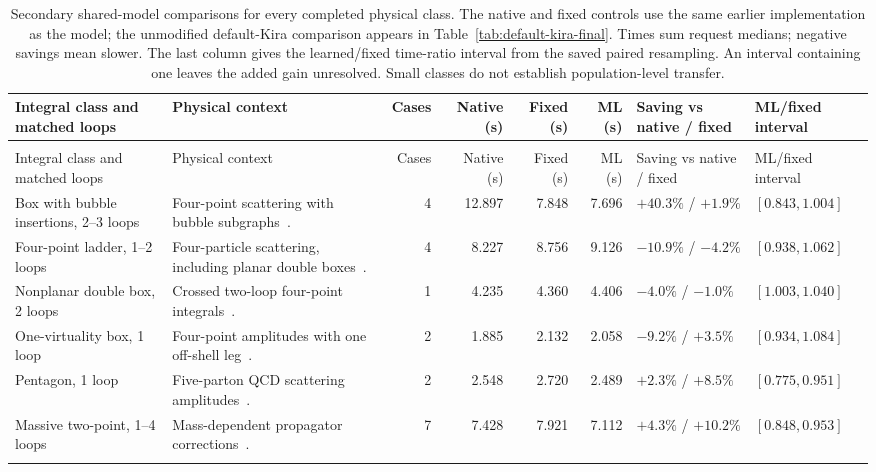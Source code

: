 \begin{landscape}
\small\setlength{\tabcolsep}{5pt}
\begin{longtable}{@{}>{\raggedright\arraybackslash}p{3.8cm}>{\raggedright\arraybackslash}p{4.4cm}rrrr>{\raggedright\arraybackslash}p{3.1cm}>{\raggedright\arraybackslash}p{3.1cm}@{}}
\caption{Secondary shared-model comparisons for every completed physical class. The native and fixed controls use the same earlier implementation as the model; the unmodified default-Kira comparison appears in Table~\ref{tab:default-kira-final}. Times sum request medians; negative savings mean slower. The last column gives the learned/fixed time-ratio interval from the saved paired resampling. An interval containing one leaves the added gain unresolved. Small classes do not establish population-level transfer.}\label{tab:native-type-summary}\\
\toprule
Integral class and matched loops & Physical context & Cases & Native (s) & Fixed (s) & ML (s) & Saving vs native / fixed & ML/fixed interval\\\midrule
\endfirsthead
\multicolumn{8}{l}{\tablename~\thetable\ continued}\\
\toprule Integral class and matched loops & Physical context & Cases & Native (s) & Fixed (s) & ML (s) & Saving vs native / fixed & ML/fixed interval\\\midrule
\endhead
\bottomrule\endfoot
Box with bubble insertions, 2--3 loops & Four-point scattering with bubble subgraphs~\cite{Weinzierl2022}. & 4 & 12.897 & 7.848 & 7.696 & $+40.3\%$ / $+1.9\%$ & $[0.843,1.004]$ \\ \addlinespace[3pt]
Four-point ladder, 1--2 loops & Four-particle scattering, including planar double boxes~\cite{Smirnov1999}. & 4 & 8.227 & 8.756 & 9.126 & $-10.9\%$ / $-4.2\%$ & $[0.938,1.062]$ \\ \addlinespace[3pt]
Nonplanar double box, 2 loops & Crossed two-loop four-point integrals~\cite{Tausk1999}. & 1 & 4.235 & 4.360 & 4.406 & $-4.0\%$ / $-1.0\%$ & $[1.003,1.040]$ \\ \addlinespace[3pt]
One-virtuality box, 1 loop & Four-point amplitudes with one off-shell leg~\cite{DennerDittmaier2006}. & 2 & 1.885 & 2.132 & 2.058 & $-9.2\%$ / $+3.5\%$ & $[0.934,1.084]$ \\ \addlinespace[3pt]
Pentagon, 1 loop & Five-parton QCD scattering amplitudes~\cite{Agarwal2024}. & 2 & 2.548 & 2.720 & 2.489 & $+2.3\%$ / $+8.5\%$ & $[0.775,0.951]$ \\ \addlinespace[3pt]
Massive two-point, 1--4 loops & Mass-dependent propagator corrections~\cite{Weinzierl2022}. & 7 & 7.428 & 7.921 & 7.112 & $+4.3\%$ / $+10.2\%$ & $[0.848,0.953]$ \\ \addlinespace[3pt]

\end{longtable}
\end{landscape}
